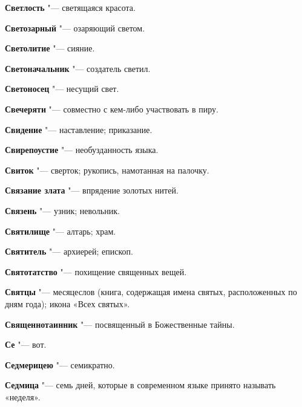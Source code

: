 \begin{mymulticols}{2}
\noindent\textbf{Светлость} "--- светящаяся красота. 




\noindent\textbf{Светозарный} "--- озаряющий светом. 




\noindent\textbf{Светолитие} "--- сияние. 




\noindent\textbf{Светоначальник} "--- создатель светил. 




\noindent\textbf{Светоносец} "--- несущий свет. 




\noindent\textbf{Свечеряти} "--- совместно с кем-либо участвовать в пиру. 




\noindent\textbf{Свидение} "--- наставление; приказание. 




\noindent\textbf{Свирепоустие} "--- необузданность языка. 




\noindent\textbf{Свиток} "--- сверток; рукопись, намотанная на палочку. 




\noindent\textbf{Связание злата} "--- впрядение золотых нитей. 




\noindent\textbf{Связень} "--- узник; невольник. 




\noindent\textbf{Святилище} "--- алтарь; храм. 




\noindent\textbf{Святитель} "--- архиерей; епископ. 




\noindent\textbf{Святотатство} "--- похищение священных вещей. 




\noindent\textbf{Святцы} "--- месяцеслов (книга, содержащая имена святых, расположенных по дням года); икона «Всех святых». 




\noindent\textbf{Священнотаинник} "--- посвященный в Божественные тайны. 




\noindent\textbf{Се} "--- вот. 




\noindent\textbf{Седмерицею} "--- семикратно. 




\noindent\textbf{Седмица} "--- семь дней, которые в современном языке принято называть «неделя». 





\end{mymulticols}
